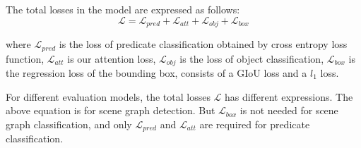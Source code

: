 The total losses in the model are expressed as follows:
$$\mathcal{L} = \mathcal{L}_{pred}+\mathcal{L}_{att} +\mathcal{L}_{obj} + \mathcal{L}_{box} $$

where  $ \mathcal{L}_{pred} $ is the loss of predicate classification obtained by cross entropy loss function, $ \mathcal{L}_{att} $ is our attention loss, $ \mathcal{L}_{obj } $ is the loss of object classification, $ \mathcal{L}_{box} $ is the regression loss of the bounding box,  consists of a GIoU loss and a $l_1$ loss.

For different evaluation models, the total losses $ \mathcal{L}  $ has different expressions. The above equation is for scene graph detection.  But $ \mathcal{L}_{box} $ is not needed for scene graph classification, and only $  \mathcal{L}_{pred}$ and $\mathcal{L}_{att} $ are required for predicate classification. 

